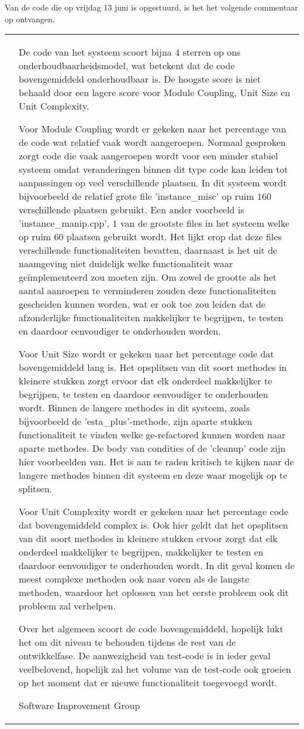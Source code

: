Van de code die op vrijdag 13 juni is opgestuurd, is het het volgende commentaar op ontvangen.

\begin{tabular}{p{1cm} | p{\textwidth - 2cm} |}
\cline{2-2}
 & \setlength{\parskip}{5pt}
De code van het systeem scoort bijna 4 sterren op ons onderhoudbaarheidsmodel, wat betekent dat de code bovengemiddeld onderhoudbaar is. De hoogste score is niet behaald door een lagere score voor Module Coupling, Unit Size en Unit Complexity.

Voor Module Coupling wordt er gekeken naar het percentage van de code wat relatief vaak wordt aangeroepen. Normaal gesproken zorgt code die vaak aangeroepen wordt voor een minder stabiel systeem omdat veranderingen binnen dit type code kan leiden tot aanpassingen op veel verschillende plaatsen. In dit systeem wordt bijvoorbeeld de relatief grote file 'instance\_misc' op ruim $160$ verschillende plaatsen gebruikt. Een ander voorbeeld is 'instance\_manip.cpp', $1$ van de grootste files in het systeem welke op ruim $60$ plaatsen gebruikt wordt. Het lijkt erop dat deze files verschillende functionaliteiten bevatten, daarnaast is het uit de naamgeving niet duidelijk welke functionaliteit waar geïmplementeerd zou moeten zijn. Om zowel de grootte als het aantal aanroepen te verminderen zouden deze functionaliteiten gescheiden kunnen worden, wat er ook toe zou leiden dat de afzonderlijke functionaliteiten makkelijker te begrijpen, te testen en daardoor eenvoudiger te onderhouden worden.

Voor Unit Size wordt er gekeken naar het percentage code dat bovengemiddeld lang is. Het opsplitsen van dit soort methodes in kleinere stukken zorgt ervoor dat elk onderdeel makkelijker te begrijpen, te testen en daardoor eenvoudiger te onderhouden wordt. Binnen de langere methodes in dit systeem, zoals bijvoorbeeld de 'esta\_plus'-methode, zijn aparte stukken functionaliteit te vinden welke ge-refactored kunnen worden naar aparte methodes. De body van condities of de 'cleanup' code zijn hier voorbeelden van. Het is aan te raden kritisch te kijken naar de langere methodes binnen dit systeem en deze waar mogelijk op te splitsen.

Voor Unit Complexity wordt er gekeken naar het percentage code dat bovengemiddeld complex is. Ook hier geldt dat het opsplitsen van dit soort methodes in kleinere stukken ervoor zorgt dat elk onderdeel makkelijker te begrijpen, makkelijker te testen en daardoor eenvoudiger te onderhouden wordt. In dit geval komen de meest complexe methoden ook naar voren als de langste methoden, waardoor het oplossen van het eerste probleem ook dit probleem zal verhelpen.

Over het algemeen scoort de code bovengemiddeld, hopelijk lukt het om dit niveau te behouden tijdens de rest van de ontwikkelfase. De aanwezigheid van test-code is in ieder geval veelbelovend, hopelijk zal het volume van de test-code ook groeien op het moment dat er nieuwe functionaliteit toegevoegd wordt. 

\hfill Software Improvement Group \\
\cline{2-2}
\end{tabular}
